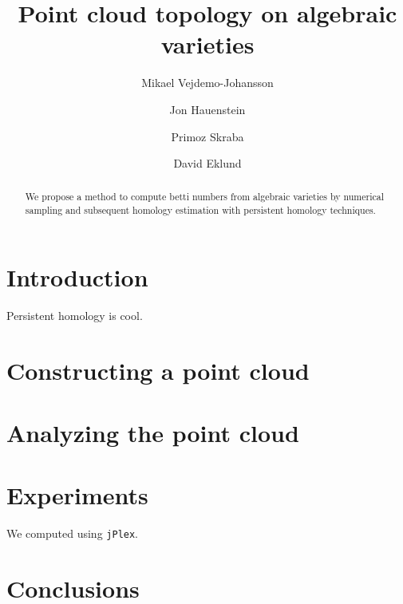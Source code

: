 \documentclass{amsart}
\begin{document}
\title{Point cloud topology on algebraic varieties}
\author{Mikael Vejdemo-Johansson \and %
  Jon Hauenstein \and %
  Primoz Skraba \and %
  David Eklund}

\maketitle

\begin{abstract}
  We propose a method to compute betti numbers from algebraic varieties by numerical sampling and subsequent homology estimation with persistent homology techniques.
\end{abstract}

\section{Introduction}
\label{sec:introduction}

Persistent homology is cool. \cite{elz2000,c09TandD}


\section{Constructing a point cloud}
\label{sec:constr-point-cloud}

\section{Analyzing the point cloud}
\label{sec:analyz-point-cloud}


\section{Experiments}
\label{sec:experiments}

We computed using \texttt{jPlex}. \cite{jplex08}

\section{Conclusions}
\label{sec:conclusions}






\end{document}

